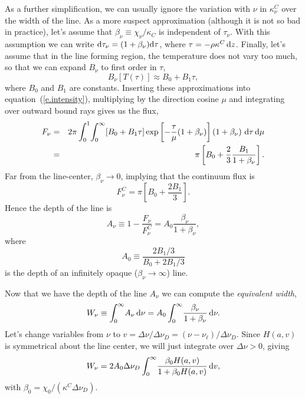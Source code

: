 As a further simplification, we can usually ignore the variation with $\nu$ in $\kappa_{\nu}^{C}$ over the width of the line. As a more suspect approximation (although it is not so bad in practice), let's assume that $\beta_{\nu} \equiv \chi_{\nu}/\kappa_{C}$ is independent of $\tau_{\nu}$. With this assumption we can write $\mathrm{d}\tau_{\nu} = (1+\beta_{\nu})\mathrm{d}\tau$, where $\tau = -\rho\kappa^{C}\,\mathrm{d} z$. Finally, let's assume that in the line forming region, the temperature does not vary too much, so that we can expand $B_{\nu}$ to first order in $\tau$,
\[ B_{\nu}[T(\tau)] \approx B_{0} + B_{1}\tau, \]
where $B_{0}$ and $B_{1}$ are constants.
Inserting these approximations into equation~(\ref{e.intensity}), multiplying by the direction cosine $\mu$ and integrating over outward bound rays gives us the flux,
\begin{eqnarray}\label{e.flux}
F_{\nu} &=& 2\pi\int_{0}^{1}\!\int_{0}^{\infty}\!\left[B_{0}+B_{1}\tau\right]\exp\left[-\frac{\tau}{\mu}(1+\beta_{\nu})\right] \left(1+\beta_{\nu}\right) \,\mathrm{d}\tau\,\mathrm{d}\mu\nonumber\\
 &=& \pi\left[ B_{0} + \frac{2}{3}\frac{B_{1}}{1+\beta_{\nu}}\right].
\end{eqnarray}
Far from the line-center, $\beta_{\nu}\to 0$, implying that the continuum flux is
\[ F_{\nu}^{C} = \pi\left[B_{0} + \frac{2B_{1}}{3}\right]. \]
Hence the depth of the line is
\begin{equation}\label{e.line-depth}
A_{\nu} \equiv 1 - \frac{F_{\nu}}{F_{\nu}^{C}} = A_{0}\frac{\beta_{\nu}}{1+\beta_{\nu}},
\end{equation}
where
\begin{equation}\label{e.A0-curve-growth}
 A_{0} \equiv \frac{2B_{1}/3}{B_{0} + 2B_{1}/3}
 \end{equation}
is the depth of an infinitely opaque ($\beta_{\nu}\to\infty$) line. 

\noindent Now that we have the depth of the line $A_{\nu}$ we can compute the \emph{equivalent width},
\begin{equation}\label{e.W}
W_{\nu} \equiv \int_{0}^{\infty}\! A_{\nu}\,\mathrm{d}\nu = A_{0}\int_{0}^{\infty}\!\frac{\beta_{\nu}}{1+\beta_{\nu}}\,\mathrm{d}\nu.
\end{equation}
Let's change variables from $\nu$ to $v = \Delta\nu/\Delta\nu_{D} = (\nu-\nu_{\ell})/\Delta\nu_{D}$.  Since $H(a,v)$ is symmetrical about the line center, we will just integrate over $\Delta\nu >0$, giving
\begin{equation}\label{e.Wv}
 W_{\nu} = 2A_{0}\Delta\nu_{D}\int_{0}^{\infty}\!\frac{\beta_{0}H(a,v)}{1+\beta_{0}H(a,v)}\,\mathrm{d} v,
 \end{equation}
with $\beta_{0} = \chi_{0}/(\kappa^{C}\Delta\nu_{D})$.

